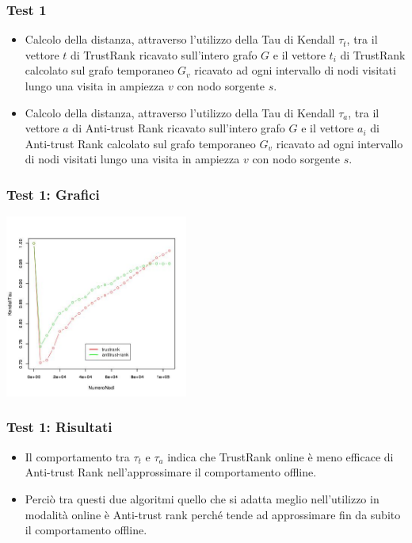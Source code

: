 \documentclass{beamer}
\begin{document}
\begin{frame}
\frametitle{Test 1}
\begin{itemize}
 \item<1-> Calcolo della distanza, attraverso l’utilizzo della Tau di Kendall \(\tau_t\), tra il vettore \(t\) di TrustRank ricavato sull’intero grafo \(G\) e il vettore \(t_i\) di TrustRank calcolato sul grafo temporaneo \(G_v\) ricavato ad ogni intervallo di nodi visitati lungo una visita in ampiezza \(v\) con nodo sorgente \(s\).
 \item<2-> Calcolo della distanza, attraverso l’utilizzo della Tau di Kendall \(\tau_a\), tra il vettore \(a\) di Anti-trust Rank ricavato sull’intero grafo \(G\) e il vettore \(a_i\) di Anti-trust Rank calcolato sul grafo temporaneo \(G_v\) ricavato ad ogni intervallo di nodi visitati lungo una visita in ampiezza \(v\) con nodo sorgente \(s\).
\end{itemize}
\end{frame}
\begin{frame}
\frametitle{Test 1: Grafici}
\begin{center}
 \includegraphics[height=6cm]{immagini/test1/coplotTrustAnti_62}
\end{center}
\end{frame}
\begin{frame}
\frametitle{Test 1: Risultati}
\begin{itemize}
 \item<1-> Il comportamento tra \(\tau_{t}\) e \(\tau_{a}\) indica che TrustRank online è meno efficace di Anti-trust Rank nell'approssimare il comportamento offline. 
 \item<2-> Perciò tra questi due algoritmi quello che si adatta meglio nell'utilizzo in modalità online è Anti-trust rank perché tende ad approssimare fin da subito il comportamento offline. 
\end{itemize}
\end{frame}
\end{document}
